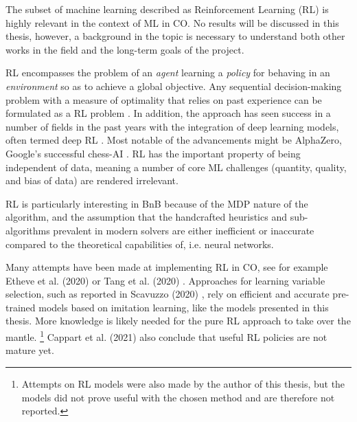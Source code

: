 The subset of machine learning described as Reinforcement Learning (\gls{RL}) is highly relevant in the context of \gls{ML} in \gls{CO}. No results will be discussed in this thesis, however, a background in the topic is necessary to understand both other works in the field and the long-term goals of the project.

\gls{RL} encompasses the problem of an \textit{agent} learning a \textit{policy} for behaving in an \textit{environment} so as to achieve a global objective. Any sequential decision-making problem with a measure of optimality that relies on past experience can be formulated as a \gls{RL} problem \cite{francois2018introduction}. In addition, the approach has seen success in a number of fields in the past years with the integration of deep learning models, often termed deep \gls{RL} \cite{francois2018introduction}. Most notable of the advancements might be AlphaZero, Google's successful chess-AI \cite{silver2017mastering}. \gls{RL} has the important property of being independent of data, meaning a number of core \gls{ML} challenges (quantity, quality, and bias of data) are rendered irrelevant. 

\gls{RL} is particularly interesting in \gls{BnB} because of the \gls{MDP} nature of the algorithm, and the assumption that the handcrafted heuristics and sub-algorithms prevalent in modern solvers are either inefficient or inaccurate compared to the theoretical capabilities of, i.e. neural networks. 

Many attempts have been made at implementing \gls{RL} in \gls{CO}, see for example Etheve et al. (2020) \cite{etheve2020reinforcement} or Tang et al. (2020) \cite{tang2020reinforcement}. Approaches for learning variable selection, such as reported in Scavuzzo (2020) \cite{scavuzzo2020learning}, rely on efficient and accurate pre-trained models based on imitation learning, like the models presented in this thesis. More knowledge is likely needed for the pure \gls{RL} approach to take over the mantle.
\footnote{Attempts on \gls{RL} models were also made by the author of this thesis, but the models did not prove useful with the chosen method and are therefore not reported.}
Cappart et al. (2021) \cite{cappart2021combinatorial} also conclude that useful \gls{RL} policies are not mature yet. 
